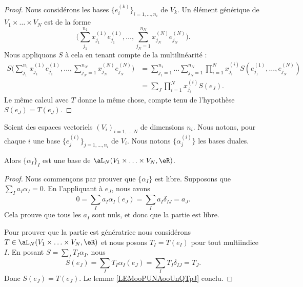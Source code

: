 \begin{proof}
	Nous considérons les bases \( \{ e^{(k)}_i \}_{i=1,\ldots,n_i}\) de \( V_k\). Un élément générique de \( V_1\times \ldots\times V_N\) est de la forme
	\begin{equation}
		\Big(  \sum_{j_1}^{n_1}x_{j_1}^{(1)}e^{(1)}_{j_1},\ldots, \sum_{j_N=1}^{n_N}x_{j_N}^{(N)}e_{j_N}^{(N)} \Big).
	\end{equation}
	Nous appliquons \( S\) à cela en tenant compte de la multilinéarité :
	\begin{subequations}
		\begin{align}
			S\Big(  \sum_{j_1}^{n_1}x_{j_1}^{(1)}e^{(1)}_{j_1},\ldots, \sum_{j_N=1}^{n_N}x_{j_N}^{(N)}e_{j_N}^{(N)} \Big) & =\sum_{j_1=1}^{n_1}\ldots \sum_{j_N=1}^{n_N}\prod_{i=1}^Nx_{j_i}^{(i)}S(e^{(1)}_{j_1},\ldots,e_{j_N}^{(N)}) \\
			                                                                                                              & =\sum_J\prod_{i=1}^Nx_{j_i}^{(i)}S(e_J).
		\end{align}
	\end{subequations}
	Le même calcul avec \( T\) donne la même chose, compte tenu de l'hypothèse \( S(e_J)=T(e_J)\).
\end{proof}

\begin{theorem}		\label{THOooTAGKooDscwFG}
	Soient des espaces vectoriels \( (V_i)_{i=1,\ldots,N}\) de dimensions \( n_i\). Nous notons, pour chaque \( i\) une base \( \{ e_j^{(i)}\}_{j=1,\ldots,n_i} \) de \( V_i\). Nous notons \( \{ \alpha_j^{(i)} \}\) les bases duales.

	Alors \( \{ \alpha_I \}_I\) est une base de \( \aL_N(V_1\times \ldots\times V_N,\eR)\).
\end{theorem}

\begin{proof}
	Nous commençons par prouver que \( \{ \alpha_I \}\) est libre. Supposons que \( \sum_Ia_I\alpha_I=0\). En l'appliquant à \( e_J\), nous avons
	\begin{equation}
		0=\sum_Ia_I\alpha_I(e_J)=\sum_{I}a_I\delta_{IJ}=a_J.
	\end{equation}
	Cela prouve que tous les \( a_I\) sont nuls, et donc que la partie est libre.

	Pour prouver que la partie est génératrice nous considérons \( T\in \aL_N(V_1\times\ldots\times V_N,\eR)\) et nous posons \( T_I=T(e_I)\) pour tout multiindice \( I\). En posant \( S=\sum_IT_I\alpha_I\), nous
	\begin{equation}
		S(e_J)=\sum_{I}T_I\alpha_I(e_J)=\sum_IT_I\delta_{IJ}=T_J.
	\end{equation}
	Donc \( S(e_J)=T(e_J)\). Le lemme \ref{LEMooPUNAooUnQTpJ} conclu.
\end{proof}

